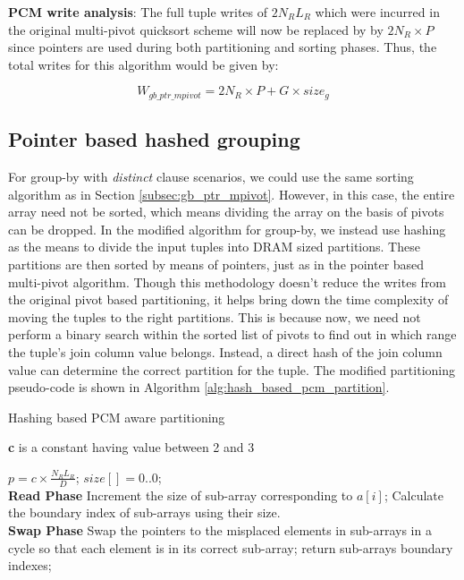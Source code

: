 \textbf{PCM write analysis}: The full tuple writes of $2 N_R L_R$ which were incurred in the original multi-pivot quicksort scheme will now be replaced by by $2N_R \times P$ since pointers are used during both partitioning and sorting phases. Thus, the total writes for this algorithm would be given by:

\begin{equation}
\label{eq:gby_ptr_mpivot}
W_{gb\_ptr\_mpivot} = 2N_R \times P + G \times size_g
\end{equation}

\subsection{Pointer based hashed grouping}

For group-by with \textit{distinct} clause scenarios, we could use the same sorting algorithm as in Section \ref{subsec:gb_ptr_mpivot}. However, in this case, the entire array need not be sorted, which means dividing the array on the basis of pivots can be dropped. In the modified algorithm for group-by, we instead use hashing as the means to divide the input tuples into DRAM sized partitions. These partitions are then sorted by means of pointers, just as in the pointer based multi-pivot algorithm. Though this methodology doesn't reduce the writes from the original pivot based partitioning, it helps bring down the time complexity of moving the tuples to the right partitions. This is because now, we need not perform a binary search within the sorted list of pivots to find out in which range the tuple's join column value belongs. Instead, a direct hash of the join column value can determine the correct partition for the tuple. The modified partitioning pseudo-code is shown in Algorithm \ref{alg:hash_based_pcm_partition}.

\begin{algorithm}[h!]
\caption{Hashing based PCM aware partitioning}
\label{alg:hash_based_pcm_partition}
\textbf{c} is a constant having value between 2 and 3\\
\begin{algorithmic}[1]
\State $ p = c\times \frac{N_R L_R}{D}$;
\State $ size[] = {0..0}$;   
\\
\textbf{Read Phase}
\State Increment the size of sub-array corresponding to $a[i]$; 
\EndFor
{}
\State Calculate the boundary index of sub-arrays using their size.\\
\textbf{Swap Phase}
\State Swap the pointers to the misplaced elements in sub-arrays in a cycle so that each element is in its correct sub-array;
\State return sub-arrays boundary indexes;
\end{algorithmic}
\end{algorithm} 

